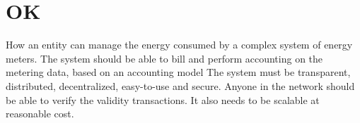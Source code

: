 \section{OK}
How an entity can manage the energy consumed by a complex system of energy meters.
The  system should be able to bill and perform accounting on the metering data, based on an accounting model
The system must be transparent, distributed, decentralized, easy-to-use and secure.
Anyone in the network should be able to verify the validity transactions.
It also needs to be scalable at reasonable cost.

